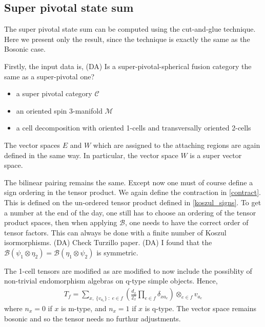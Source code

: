 \documentclass[12pt,a4paper]{article}
\newcommand{\tp}{\otimes}
\newcommand{\mcb}{\mathcal{B}}
\newcommand{\mcc}{\mathcal{C}}
\newcommand{\mcm}{\mathcal{M}}
\newcommand{\dave}[1]{{\color{ao(english)}\footnotesize{(DA) #1}}}
\begin{document}



\subsection{Super pivotal state sum}
The super pivotal state sum can be computed using the cut-and-glue technique. 
Here we present only the result, since the technique is exactly the same as the Bosonic case.

Firstly, the input data is,
\dave{Is a super-pivotal-spherical fusion category the same as a super-pivotal one?}
\begin{itemize} 
\item a super pivotal category $\mcc$
\item an oriented spin 3-manifold $\mcm$
\item a cell decomposition with oriented 1-cells and transversally oriented 2-cells
\end{itemize} 

The vector spaces $E$ and $W$ which are assigned to the attaching regions are again defined in the same way. 
In particular, the vector space $W$ is a super vector space. 

The bilinear pairing remains the same. 
Except now one must of course define a sign ordering in the tensor product.
We again define the contraction in \eqref{contract}.
This is defined on the un-ordered tensor product defined in \ref{koszul_signs}.
To get a number at the end of the day, one still has to choose an ordering of the tensor product spaces, 
then when applying $\mcb$, one needs to have the correct order of tensor factors.
This can always be done with a finite number of Koszul isormorphisms.
\dave{Check Turzillo paper.}
\dave{I found that the $\mcb(\psi_1 \tp \eta_2) = \mcb(\eta_1 \tp \psi _2)$ is symmetric. }

The 1-cell tensors are modified as are modified to now include the possiblity of non-trivial endomorphism algebras on q-type simple objects. 
Hence, 
\begin{align}
T_f = \sum_{x, \; \{ v_{a_{e}}\} \;  : \;e \in f} \left( \frac{d_x}{2^n_x}  \prod_{e \in f} \delta_{x a_e} \right)   \tp _{e \in f}v_{a_e}
\end{align}
where $n_x = 0$ if $x$ is m-type, and $n_x = 1$ if $x$ is q-type. 
The vector space remains bosonic and so the tensor needs no furthur adjustments. 
\end{document}
